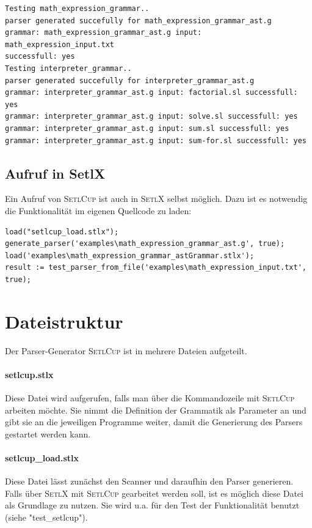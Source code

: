 \begin{enumerate}
\begin{flushleft}
\begin{Verbatim}
Testing math_expression_grammar..
parser generated succefully for math_expression_grammar_ast.g
grammar: math_expression_grammar_ast.g input: math_expression_input.txt 
successfull: yes
Testing interpreter_grammar..
parser generated succefully for interpreter_grammar_ast.g
grammar: interpreter_grammar_ast.g input: factorial.sl successfull: yes
grammar: interpreter_grammar_ast.g input: solve.sl successfull: yes
grammar: interpreter_grammar_ast.g input: sum.sl successfull: yes
grammar: interpreter_grammar_ast.g input: sum-for.sl successfull: yes
\end{Verbatim}
\end{flushleft}
\end{enumerate}
\subsection{Aufruf in SetlX}
Ein Aufruf von \textsc{SetlCup} ist auch in \textsc{SetlX} selbst möglich. Dazu ist es notwendig die Funktionalität im eigenen Quellcode zu laden:
\begin{Verbatim}
load("setlcup_load.stlx");
generate_parser('examples\math_expression_grammar_ast.g', true);
load('examples\math_expression_grammar_astGrammar.stlx');
result := test_parser_from_file('examples\math_expression_input.txt', true);
\end{Verbatim}
\section{Dateistruktur}
Der Parser-Generator \textsc{SetlCup} ist in mehrere Dateien aufgeteilt.
\paragraph{setlcup.stlx} Diese Datei wird aufgerufen, falls man über die Kommandozeile mit \textsc{SetlCup} arbeiten möchte. Sie nimmt die Definition der Grammatik als Parameter an und gibt sie an die jeweiligen Programme weiter, damit die Generierung des Parsers gestartet werden kann.
\paragraph{setlcup\_load.stlx} Diese Datei lässt zunächst den Scanner und daraufhin den Parser generieren. Falls über \textsc{SetlX} mit \textsc{SetlCup} gearbeitet werden soll, ist es möglich diese Datei als Grundlage zu nutzen. Sie wird u.a. für den Test der Funktionalität benutzt (siehe "test\_setlcup").
